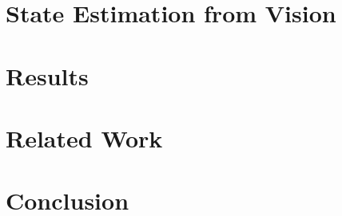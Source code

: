 \documentclass{article}
\begin{document}
\section{State Estimation from Vision}
\label{sec:train-vision}


\section{Results}
\label{sec:results}


\section{Related Work}


\section{Conclusion}




\medskip
{
\small

}


\newpage
\appendix
\appendixpage
\startcontents[appendices]
\newpage







\end{document}
